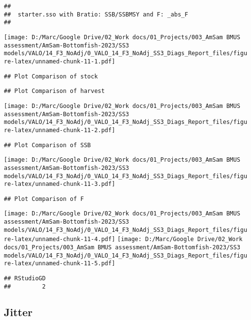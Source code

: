 \documentclass[
]{article}
\begin{document}
\begin{verbatim}
## 
##  starter.sso with Bratio: SSB/SSBMSY and F: _abs_F 
## 
\end{verbatim}

\texttt{[image: D:/Marc/Google Drive/02\_Work docs/01\_Projects/003\_AmSam BMUS assessment/AmSam-Bottomfish-2023/SS3 models/VALO/14\_F3\_NoAdj/0\_VALO\_14\_F3\_NoAdj\_SS3\_Diags\_Report\_files/figure-latex/unnamed-chunk-11-1.pdf]}

\begin{verbatim}
## Plot Comparison of stock
\end{verbatim}

\begin{verbatim}
## Plot Comparison of harvest
\end{verbatim}

\texttt{[image: D:/Marc/Google Drive/02\_Work docs/01\_Projects/003\_AmSam BMUS assessment/AmSam-Bottomfish-2023/SS3 models/VALO/14\_F3\_NoAdj/0\_VALO\_14\_F3\_NoAdj\_SS3\_Diags\_Report\_files/figure-latex/unnamed-chunk-11-2.pdf]}

\begin{verbatim}
## Plot Comparison of SSB
\end{verbatim}

\texttt{[image: D:/Marc/Google Drive/02\_Work docs/01\_Projects/003\_AmSam BMUS assessment/AmSam-Bottomfish-2023/SS3 models/VALO/14\_F3\_NoAdj/0\_VALO\_14\_F3\_NoAdj\_SS3\_Diags\_Report\_files/figure-latex/unnamed-chunk-11-3.pdf]}

\begin{verbatim}
## Plot Comparison of F
\end{verbatim}

\texttt{[image: D:/Marc/Google Drive/02\_Work docs/01\_Projects/003\_AmSam BMUS assessment/AmSam-Bottomfish-2023/SS3 models/VALO/14\_F3\_NoAdj/0\_VALO\_14\_F3\_NoAdj\_SS3\_Diags\_Report\_files/figure-latex/unnamed-chunk-11-4.pdf]}
\texttt{[image: D:/Marc/Google Drive/02\_Work docs/01\_Projects/003\_AmSam BMUS assessment/AmSam-Bottomfish-2023/SS3 models/VALO/14\_F3\_NoAdj/0\_VALO\_14\_F3\_NoAdj\_SS3\_Diags\_Report\_files/figure-latex/unnamed-chunk-11-5.pdf]}

\begin{verbatim}
## RStudioGD 
##         2
\end{verbatim}

\hypertarget{jitter}{%
\subsection{Jitter}\label{jitter}}
\end{document}
